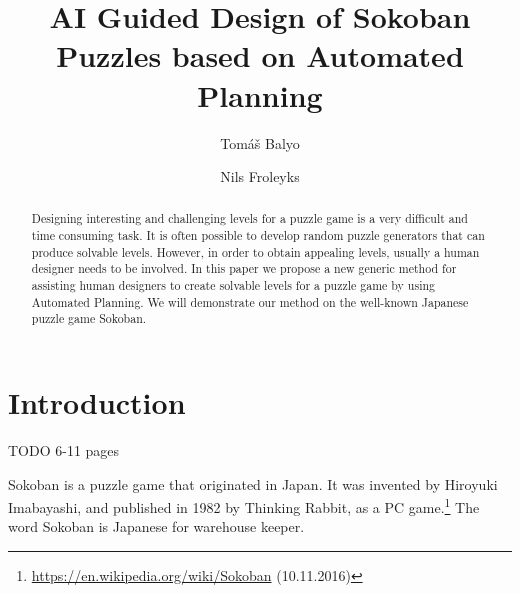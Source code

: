 \documentclass[runningheads]{llncs}
\begin{document}
%
\title{AI Guided Design of Sokoban Puzzles based on Automated Planning}
%
%
\author{Tom\'a\v{s} Balyo \and
Nils Froleyks}
%
%
%
\maketitle              %

\newcommand{\sokoimg}[1]{\texttt{[image: \#1]} \hspace{-0.35em}}

\newcommand{\w}{\sokoimg{figures/wall.pdf}}
\newcommand{\e}{\sokoimg{figures/empty.pdf}}
\newcommand{\p}{\sokoimg{figures/player.pdf}}
\newcommand{\x}{\sokoimg{figures/box.pdf}}
\newcommand{\g}{\sokoimg{figures/goal.pdf}}
\newcommand{\h}{\sokoimg{figures/goalbox.pdf}}
\newcommand{\n}{\\
\vspace{-0.09em}}

%
\begin{abstract}
Designing interesting and challenging levels for a puzzle game is a very difficult and time
consuming task. It is often possible to develop random puzzle generators that can produce
solvable levels. However, in order to obtain appealing levels, usually a human designer 
needs to be involved. In this paper we propose a new generic method for assisting human
designers to create solvable levels for a puzzle game by using Automated Planning. 
We will demonstrate our method on the well-known Japanese puzzle game Sokoban.

\end{abstract}
%
%
%
\section{Introduction}

TODO 6-11 pages

Sokoban is a puzzle game that originated in Japan. It was invented by Hiroyuki
Imabayashi, and published in 1982 by Thinking Rabbit, as a PC game.\footnote{
  \url{https://en.wikipedia.org/wiki/Sokoban} (10.11.2016) } The word Sokoban is Japanese for warehouse keeper.
\end{document}
